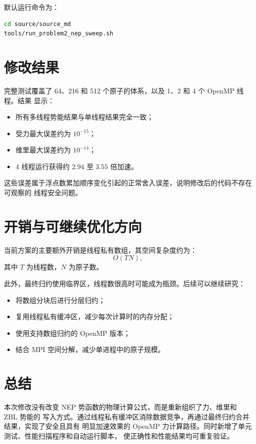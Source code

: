 \documentclass[11pt,a4paper,fontset=fandol]{ctexart}
\begin{document}
默认运行命令为：

\begin{lstlisting}[language=bash]
cd source/source_md
tools/run_problem2_nep_sweep.sh
\end{lstlisting}

\section{修改结果}

完整测试覆盖了 64、216 和 512 个原子的体系，以及 1、2 和 4 个 OpenMP 线程。结果
显示：
\begin{itemize}
  \item 所有多线程势能结果与单线程结果完全一致；
  \item 受力最大误差约为 \(10^{-15}\)；
  \item 维里最大误差约为 \(10^{-14}\)；
  \item 4 线程运行获得约 \(2.94\) 至 \(3.55\) 倍加速。
\end{itemize}

这些误差属于浮点数累加顺序变化引起的正常舍入误差，说明修改后的代码不存在可观察的
线程安全问题。

\section{开销与可继续优化方向}

当前方案的主要额外开销是线程私有数组，其空间复杂度约为：
\[
O(TN),
\]
其中 \(T\) 为线程数，\(N\) 为原子数。

此外，最终归约使用临界区，线程数很高时可能成为瓶颈。后续可以继续研究：
\begin{itemize}
  \item 将数组分块后进行分层归约；
  \item 复用线程私有缓冲区，减少每次计算时的内存分配；
  \item 使用支持数组归约的 OpenMP 版本；
  \item 结合 MPI 空间分解，减少单进程中的原子规模。
\end{itemize}

\section{总结}

本次修改没有改变 NEP 势函数的物理计算公式，而是重新组织了力、维里和 ZBL 势能的
写入方式。通过线程私有缓冲区消除数据竞争，再通过最终归约合并结果，实现了安全且具有
明显加速效果的 OpenMP 力计算路径。同时新增了单元测试、性能扫描程序和自动运行脚本，
使正确性和性能结果均可重复验证。
\end{document}
